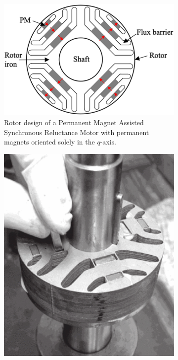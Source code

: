 \documentclass[a4paper, twoside, 11pt]{article}
\begin{document}
\begin{figure}[H]
    \begin{subfigure}{0.4\textwidth}
            \centering
            \includegraphics[width=1\textwidth]{src/png/pmsynrelm-rotor-magnets-q-axis.png}
            \caption{Rotor design of a Permanent Magnet Assisted Synchronous Reluctance Motor with permanent magnets oriented solely in the $q$-axis. \cite{tavernini-design-and-optimisation-of-energy-efficient-pmsynrelm-for-electric-vehicles}}
            \label{fig:pmsynrelm-rotor-magnets-q-axis}
    \end{subfigure}
\hfill
    \begin{subfigure}{0.4\textwidth}
            \centering
            \includegraphics[width=1\textwidth]{src/png/pm-inserted.png}

\end{subfigure}
\end{figure}
\end{document}
